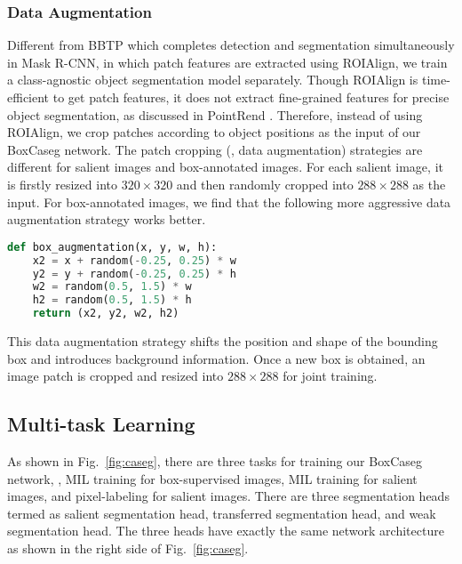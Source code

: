 \documentclass[final]{cvpr}
\begin{document}
\vspace{-3mm}
\subsubsection{Data Augmentation}
\vspace{-2mm}
Different from BBTP which completes detection and segmentation simultaneously in Mask R-CNN, in which patch features are extracted using ROIAlign, we train a class-agnostic object segmentation model separately. Though ROIAlign is time-efficient to get patch features, it does not extract fine-grained features for precise object segmentation,  as discussed in PointRend \cite{kirillov2020pointrend}. Therefore, instead of using ROIAlign, we crop patches according to object positions as the input of our BoxCaseg network. The patch cropping (\ie, data augmentation) strategies are different for salient images and box-annotated images. For each salient image, it is firstly resized into $320\times 320$ and then randomly cropped into $288\times 288$ as the input. For box-annotated images, we find that the following more aggressive data augmentation strategy works better. 
\vspace{-1mm}
\begin{lstlisting}[language=Python]
def box_augmentation(x, y, w, h):
    x2 = x + random(-0.25, 0.25) * w
    y2 = y + random(-0.25, 0.25) * h
    w2 = random(0.5, 1.5) * w
    h2 = random(0.5, 1.5) * h
    return (x2, y2, w2, h2)
\end{lstlisting}    \vspace{-1mm}
This data augmentation strategy shifts the position and shape of the bounding box and introduces background information. Once a new box is obtained, an image patch is cropped and resized into $288\times 288$ for joint training. 









\subsection{Multi-task Learning}
As shown in Fig.~\ref{fig:caseg}, there are three tasks for training our BoxCaseg network, \ie, MIL training for box-supervised images, MIL training for salient images, and pixel-labeling for salient images. There are three segmentation heads termed as salient segmentation head, transferred segmentation head, and weak segmentation head. The three heads have exactly the same network architecture as shown in the right side of Fig.~\ref{fig:caseg}.
\end{document}

